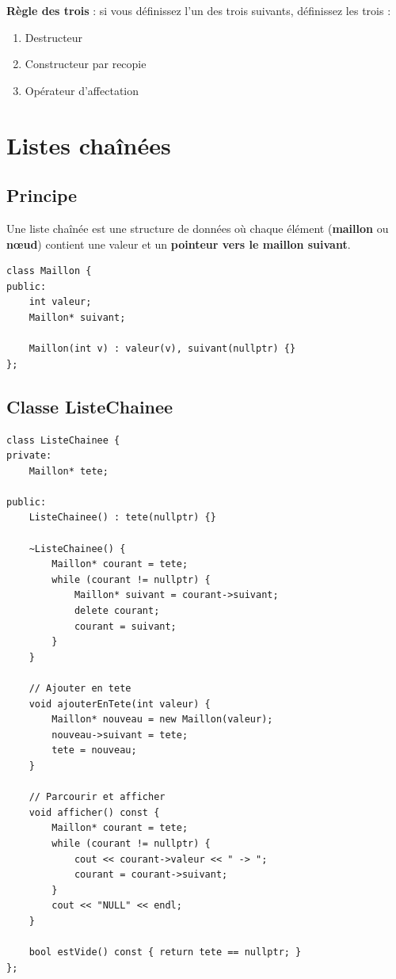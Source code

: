 \documentclass[12pt,a4paper]{article}
\begin{document}
\begin{regle}
\textbf{Règle des trois} : si vous définissez l'un des trois suivants, définissez les trois :
\begin{enumerate}
    \item Destructeur
    \item Constructeur par recopie
    \item Opérateur d'affectation
\end{enumerate}
\end{regle}

\section{Listes chaînées}

\subsection{Principe}

Une liste chaînée est une structure de données où chaque élément (\textbf{maillon} ou \textbf{nœud}) contient une valeur et un \textbf{pointeur vers le maillon suivant}.

\begin{lstlisting}[style=cpp, caption={Structure d'un maillon}]
class Maillon {
public:
    int valeur;
    Maillon* suivant;

    Maillon(int v) : valeur(v), suivant(nullptr) {}
};
\end{lstlisting}

\subsection{Classe ListeChainee}

\begin{lstlisting}[style=cpp, caption={Liste chaînée complète}]
class ListeChainee {
private:
    Maillon* tete;

public:
    ListeChainee() : tete(nullptr) {}

    ~ListeChainee() {
        Maillon* courant = tete;
        while (courant != nullptr) {
            Maillon* suivant = courant->suivant;
            delete courant;
            courant = suivant;
        }
    }

    // Ajouter en tete
    void ajouterEnTete(int valeur) {
        Maillon* nouveau = new Maillon(valeur);
        nouveau->suivant = tete;
        tete = nouveau;
    }

    // Parcourir et afficher
    void afficher() const {
        Maillon* courant = tete;
        while (courant != nullptr) {
            cout << courant->valeur << " -> ";
            courant = courant->suivant;
        }
        cout << "NULL" << endl;
    }

    bool estVide() const { return tete == nullptr; }
};
\end{lstlisting}
\end{document}
